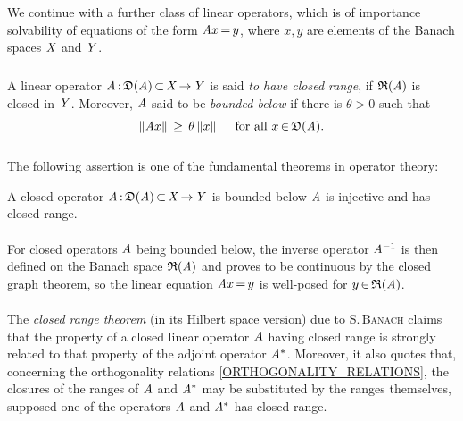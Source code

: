 \documentclass[11pt,twoside]{article}
\begin{document}
\subsubsection*{} %
We continue with a further class of linear operators,
which is of importance {\wrt} solvability of equations
of the form $\mathit{A} x {\,=\,} y$,
where $x,y$ are elements of the Banach spaces $\mathit{X}$ and $\mathit{Y}$.

\subparagraph*{}
A linear operator $\mathit{A} {\,:\,} \mathfrak{D}(\mathit{A}) {\,\subset\,} \mathit{X} {\,\to\,} \mathit{Y}$
is said \textit{to have closed range}, 
if $\mathfrak{R}(\mathit{A})$ is closed in $\mathit{Y}$.
Moreover,
$\mathit{A}$ said to be \textit{bounded below}
if there is $\theta > 0$ such that 
\begin{equation}\label{BOUNDED_FROM_BELOW_ESTIMATE}
\left\lVert \mathit{A} x \right\rVert \, \geq \, \theta \left\lVert x \right\rVert \quad \mbox{ for all } x {\,\in\,} \mathfrak{D}(\mathit{A}).
\end{equation}

\subparagraph*{}
The following assertion is one of the fundamental theorems in operator theory:

\begin{theorem}\label{BOUNDED_FROM_BELOW_THEOREM}
A closed operator $\mathit{A} {\,:\,} \mathfrak{D}(\mathit{A}) {\,\subset\,} \mathit{X} {\,\to\,} \mathit{Y}$
is bounded below
\iff
$\mathit{A}$ is injective and has closed range.
\end{theorem}

\paragraph*{}
For closed operators $\mathit{A}$ being bounded below,
the inverse operator $\mathit{A}^{-1}$
is then defined on the Banach space $\mathfrak{R}(\mathit{A})$
and proves to be continuous by the {closed graph theorem},
so the linear equation $\mathit{A} x {\,=\,} y$ is well-posed for $y {\,\in\,} \mathfrak{R}(\mathit{A})$.

\paragraph*{}
The \textit{closed range theorem} (in its Hilbert space version)
due to \textsc{S.\,Banach} claims
that the property of a closed linear operator $\mathit{A}$ having closed range
is strongly related to that property of the adjoint operator $\mathit{A}^*$.
Moreover,
it also quotes that,
concerning the orthogonality relations \eqref{ORTHOGONALITY_RELATIONS},
the closures of the ranges of $\mathit{A}$ and $\mathit{A}^*$ 
may be substituted by the ranges themselves,
supposed one of the operators $\mathit{A}$ and $\mathit{A}^*$ has closed range.
\end{document}
